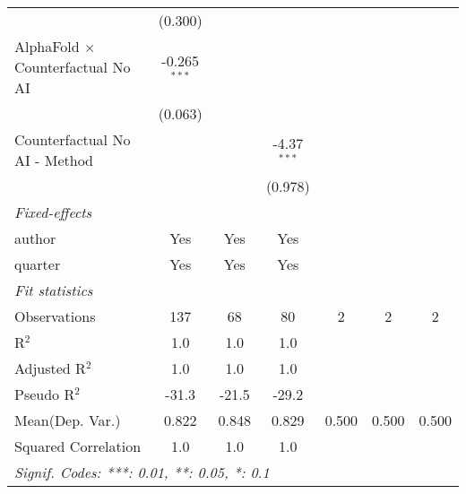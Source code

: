 \begin{tabular}{lcccccc}
                                            & (0.300)        &                &               &     &     &   \\   
   AlphaFold $\times$ Counterfactual No AI  & -0.265$^{***}$ &                &               &     &     &   \\   
                                            & (0.063)        &                &               &     &     &   \\   
   Counterfactual No AI - Method            &                &                & -4.37$^{***}$ &     &     &   \\   
                                            &                &                & (0.978)       &     &     &   \\   
   \midrule
   \emph{Fixed-effects}\\
   author                                   & Yes            & Yes            & Yes           &     &     & \\  
   quarter                                  & Yes            & Yes            & Yes           &     &     & \\  
   \midrule
   \emph{Fit statistics}\\
   Observations                             & 137            & 68             & 80            & 2   & 2   & 2\\  
   R$^2$                                    & 1.0            & 1.0            & 1.0           &     &     & \\  
   Adjusted R$^2$                           & 1.0            & 1.0            & 1.0           &     &     & \\  
   Pseudo R$^2$                             & -31.3          & -21.5          & -29.2         &     &     & \\  
Mean(Dep. Var.) & 0.822 & 0.848 & 0.829 & 0.500 & 0.500 & 0.500 \\
   Squared Correlation                      & 1.0            & 1.0            & 1.0           &     &     & \\  
   \midrule \midrule
   \multicolumn{7}{l}{\emph{Signif. Codes: ***: 0.01, **: 0.05, *: 0.1}}\\
\end{tabular}
\par\endgroup
